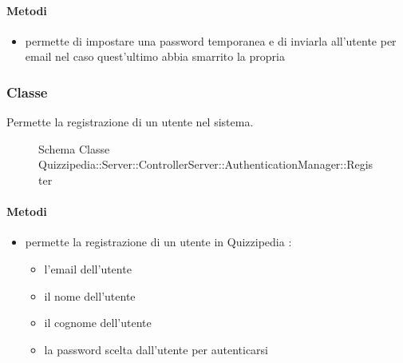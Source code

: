 \paragraph{Metodi}
\begin{itemize}
\item {}
\newline
permette di impostare una password temporanea e di inviarla all'utente per email nel caso quest'ultimo abbia smarrito la propria
\newline
\end{itemize}
\subsubsection{Classe }
Permette la registrazione di un utente nel sistema.
\begin{figure}[H]
\centering
\noindent{}
\caption[Schema Classe Register]{Schema Classe Quizzipedia::Server::ControllerServer::AuthenticationManager::Register}
\end{figure}
\paragraph{Metodi}
\begin{itemize}
\item {}
\newline
permette la registrazione di un utente in Quizzipedia
\newline
{} :
\begin{itemize}
\item {}
\newline
l'email dell'utente
\item {}
\newline
il nome dell'utente
\item {}
\newline
il cognome dell'utente
\item {}
\newline
la password scelta dall'utente per autenticarsi
\end{itemize}
\end{itemize}
